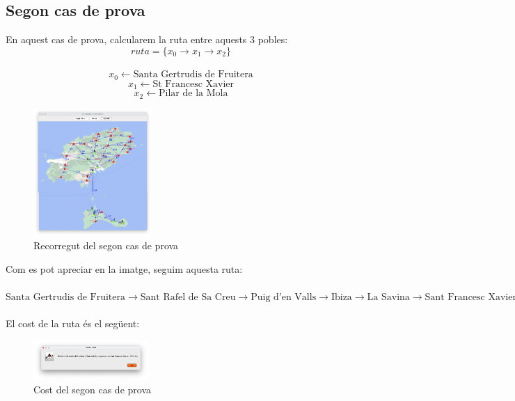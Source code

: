 \documentclass[conference]{IEEEtran}
\begin{document}
    \subsection{Segon cas de prova}

     En aquest cas de prova, calcularem la ruta entre aquests 3 pobles:
    $$ruta=\{x_{0}\rightarrow x_{1}\rightarrow x_{2}\}$$\\
    $$x_{0}\gets \textrm{Santa Gertrudis de Fruitera}$$
    $$x_{1}\gets \textrm{St Francesc Xavier}$$
    $$x_{2}\gets \textrm{Pilar de la Mola}$$

    \begin{figure}[ht]
        \centering
        \includegraphics[width=0.4\textwidth]{images/cami_2.png}
        \caption{Recorregut del segon cas de prova}
    \end{figure}

    Com es pot apreciar en la imatge, seguim aquesta ruta:\\\\
    $\textrm{Santa Gertrudis de Fruitera} \rightarrow \textrm{Sant Rafel de Sa Creu} \rightarrow \textrm{Puig d'en Valls} \rightarrow \textrm{Ibiza} \rightarrow \textrm{La Savina} \rightarrow \textrm{Sant Francesc Xavier}\rightarrow \textrm{Puig d'en Valls} \rightarrow \textrm{Ibiza} \rightarrow \textrm{La Savina} \rightarrow \textrm{Sant Francesc Xavier} \rightarrow \textrm{Es Caló} \rightarrow \textrm{Pilar de la Mola}$\\\\
    El cost de la ruta és el següent:
    \begin{figure}[ht]
        \centering
        \includegraphics[width=0.388\textwidth]{images/cost_2.png}
        \caption{Cost del segon cas de prova}
    \end{figure}
\end{document}

